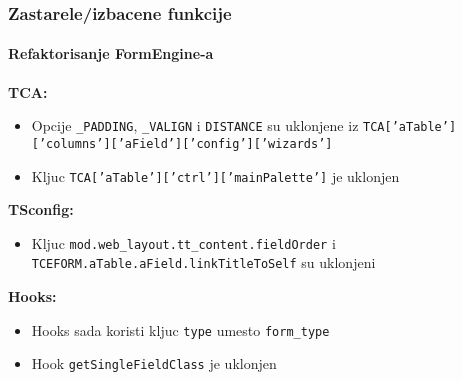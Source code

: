 \begin{frame}[fragile]
	\frametitle{Zastarele/izbacene funkcije}
	\framesubtitle{Refaktorisanje FormEngine-a}

		\textbf{TCA:}

			\small
			\begin{itemize}

				\item Opcije \texttt{\_PADDING}, \texttt{\_VALIGN} i \texttt{DISTANCE}
					su uklonjene iz
					\texttt{TCA['aTable']['columns']['aField']['config']['wizards']}

				\item Kljuc \texttt{TCA['aTable']['ctrl']['mainPalette']} je uklonjen

			\end{itemize}

		\textbf{TSconfig:}

			\small
			\begin{itemize}
				\item Kljuc \texttt{mod.web\_layout.tt\_content.fieldOrder} i
					\texttt{TCEFORM.aTable.aField.linkTitleToSelf} su uklonjeni
			\end{itemize}

		\textbf{Hooks:}

			\small
			\begin{itemize}
				\item Hooks sada koristi kljuc \texttt{type} umesto \texttt{form\_type} 
				\item Hook \texttt{getSingleFieldClass} je uklonjen
			\end{itemize}

\end{frame}


